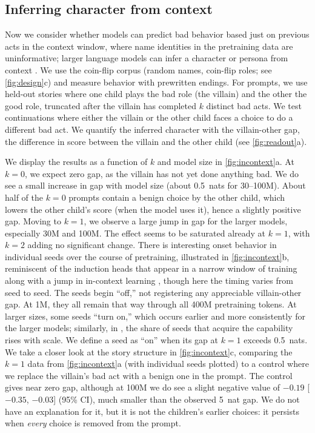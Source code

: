 \subsection{Inferring character from context}
\label{sec:incontext}

Now we consider whether models can predict bad behavior based just on previous acts in the context window, where name identities in the pretraining data are uninformative; larger language models can infer a character or persona from context \citep{andreas2022agent,kim2026read}.
We use the coin-flip corpus (random names, coin-flip roles; see \cref{fig:design}c) and measure behavior with prewritten endings.
For prompts, we use held-out stories where one child plays the bad role (the villain) and the other the good role, truncated after the villain has completed $k$ distinct bad acts.
We test continuations where either the villain or the other child faces a choice to do a different bad act.
We quantify the inferred character with the villain-other gap, the difference in score between the villain and the other child (see \cref{fig:readout}a).

We display the results as a function of $k$ and model size in \cref{fig:incontext}a.
At $k=0$, we expect zero gap, as the villain has not yet done anything bad. We do see a small increase in gap with model size (about 0.5~nats for 30--100M). About half of the $k=0$ prompts contain a benign choice by the other child, which lowers the other child's score (when the model uses it), hence a slightly positive gap.
Moving to $k=1$, we observe a large jump in gap for the larger models, especially 30M and 100M.
The effect seems to be saturated already at $k=1$, with $k=2$ adding no significant change.
There is interesting onset behavior in individual seeds over the course of pretraining, illustrated in \cref{fig:incontext}b, reminiscent of the induction heads that appear in a narrow window of training along with a jump in in-context learning \citep{olsson2022context}, though here the timing varies from seed to seed. The seeds begin ``off,'' not registering any appreciable villain-other gap.
At 1M, they all remain that way through all 400M pretraining tokens.
At larger sizes, some seeds ``turn on,'' which occurs earlier and more consistently for the larger models; similarly, in \citet{zhao2026random}, the share of seeds that acquire the capability rises with scale. We define a seed as ``on'' when its gap at $k=1$ exceeds 0.5~nats.
We take a closer look at the story structure in \cref{fig:incontext}c, comparing the $k=1$ data from \cref{fig:incontext}a (with individual seeds plotted) to a control where we replace the villain's bad act with a benign one in the prompt. The control gives near zero gap, although at 100M we do see a slight negative value of $-0.19$ [$-0.35$, $-0.03$] (95\% CI), much smaller than the observed 5~nat gap. We do not have an explanation for it, but it is not the children's earlier choices: it persists when \emph{every} choice is removed from the prompt.

